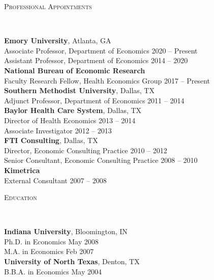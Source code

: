\documentclass[9pt]{article}
\newenvironment{changemargin}[2]{%
  \begin{list}{}{%
    \setlength{\topsep}{0pt}%
    \setlength{\leftmargin}{#1}%
    \setlength{\rightmargin}{#2}%
    \setlength{\listparindent}{\parindent}%
    \setlength{\itemindent}{\parindent}%
    \setlength{\parsep}{\parskip}%
  }%
  \item[]}{\end{list}
}
\newcommand{\lineover}{
	\begin{changemargin}{-0.05in}{-0.05in}
		\vspace*{-8pt}
		\hrulefill \\
		\vspace*{-2pt}
	\end{changemargin}
}
\newcommand{\header}[1]{
	\begin{changemargin}{-0.5in}{-0.5in}
		\scshape{#1}\\
  	\lineover
	\end{changemargin}
}
\newenvironment{body} {
	\vspace*{-16pt}
	\begin{changemargin}{-0.25in}{-0.5in}
  }	
	{\end{changemargin}
}
\begin{document}
\header{Professional Appointments}
\begin{body}
  \vspace{14pt}
  \textbf{Emory University}, Atlanta, GA \\
  \hspace{0.05in} Associate Professor, Department of Economics \hfill 2020 -- Present \\
  \hspace{0.05in} Assistant Professor, Department of Economics \hfill 2014 -- 2020 \\

  \medskip
  \textbf{National Bureau of Economic Research} \\
  \hspace{0.05in} Faculty Research Fellow, Health Economics Group \hfill 2017 -- Present \\

  \medskip
  \textbf{Southern Methodist University}, Dallas, TX \\
  \hspace{0.05in} Adjunct Professor, Department of Economics \hfill 2011 -- 2014 \\

  \medskip
  \textbf{Baylor Health Care System}, Dallas, TX \\
  \hspace{0.05in} Director of Health Economics \hfill 2013 -- 2014 \\
  \hspace{0.05in} Associate Investigator \hfill 2012 -- 2013 \\

  \medskip
  \textbf{FTI Consulting}, Dallas, TX \\
  \hspace{0.05in} Director, Economic Consulting Practice \hfill 2010 -- 2012 \\
  \hspace{0.05in} Senior Consultant, Economic Consulting Practice \hfill 2008 -- 2010 \\

  \medskip
  \textbf{Kimetrica} \\
  \hspace{0.05in} External Consultant \hfill 2007 -- 2008 \\

\end{body}
\smallskip


\header{Education}
\begin{body}
  \vspace{14pt}
 \textbf{Indiana University}, Bloomington, IN\\
  \hspace{0.05in} Ph.D. in Economics \hfill May 2008\\
  \hspace{0.05in} M.A. in Economics \hfill Feb 2007 \\
 \medskip
 \textbf{University of North Texas}, Denton, TX\\
  \hspace{0.05in} B.B.A. in Economics \hfill May 2004\\
\end{body}
\smallskip
\end{document}
